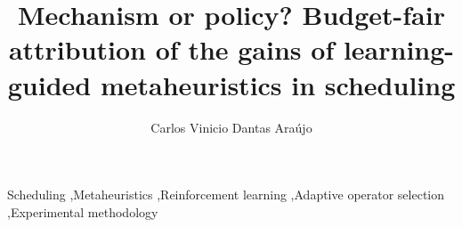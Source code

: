\documentclass[final,3p,times,11pt,authoryear]{elsarticle}
\begin{document}
\begin{frontmatter}

\title{Mechanism or policy? Budget-fair attribution of the gains of learning-guided
       metaheuristics in scheduling}

\author{Carlos Vinicio Dantas Araújo}
\address{Graduate Program in Computer Science, State University of Ceará
         (UECE), Fortaleza, CE, Brazil}



\begin{keyword}
Scheduling \sep Metaheuristics \sep Reinforcement learning \sep Adaptive operator selection \sep Experimental methodology
\end{keyword}

\end{frontmatter}













\end{document}
